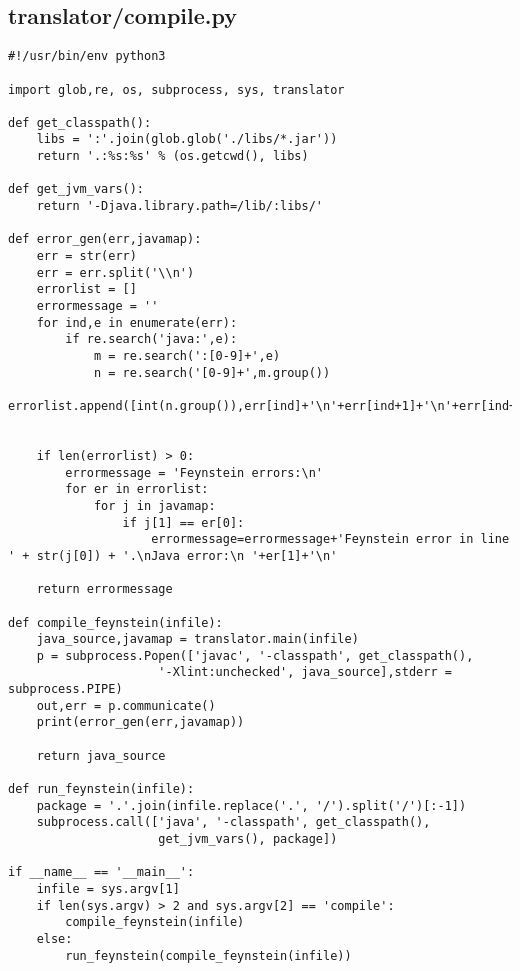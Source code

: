 \subsection*{translator/compile.py}
\begin{lstlisting}
#!/usr/bin/env python3

import glob,re, os, subprocess, sys, translator

def get_classpath():
    libs = ':'.join(glob.glob('./libs/*.jar'))
    return '.:%s:%s' % (os.getcwd(), libs)

def get_jvm_vars():
    return '-Djava.library.path=/lib/:libs/'

def error_gen(err,javamap):
    err = str(err)
    err = err.split('\\n')
    errorlist = []
    errormessage = ''
    for ind,e in enumerate(err):
        if re.search('java:',e):
            m = re.search(':[0-9]+',e)
            n = re.search('[0-9]+',m.group())
            errorlist.append([int(n.group()),err[ind]+'\n'+err[ind+1]+'\n'+err[ind+2]])
            

    if len(errorlist) > 0:
        errormessage = 'Feynstein errors:\n'
        for er in errorlist:
            for j in javamap:
                if j[1] == er[0]:
                    errormessage=errormessage+'Feynstein error in line ' + str(j[0]) + '.\nJava error:\n '+er[1]+'\n'

    return errormessage

def compile_feynstein(infile):
    java_source,javamap = translator.main(infile)
    p = subprocess.Popen(['javac', '-classpath', get_classpath(), 
                     '-Xlint:unchecked', java_source],stderr = subprocess.PIPE)
    out,err = p.communicate()
    print(error_gen(err,javamap))

    return java_source

def run_feynstein(infile):
    package = '.'.join(infile.replace('.', '/').split('/')[:-1])
    subprocess.call(['java', '-classpath', get_classpath(), 
                     get_jvm_vars(), package])

if __name__ == '__main__':
    infile = sys.argv[1]
    if len(sys.argv) > 2 and sys.argv[2] == 'compile':
        compile_feynstein(infile)
    else:
        run_feynstein(compile_feynstein(infile))
\end{lstlisting}

